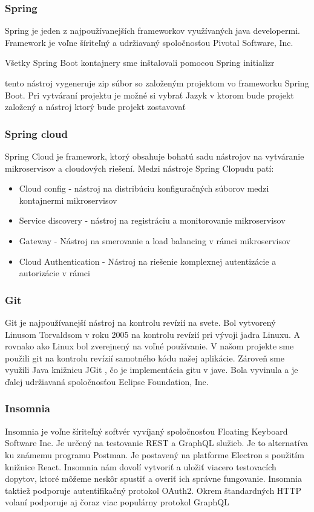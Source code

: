 \subsubsection{Spring}
Spring je jeden z najpoužívanejších frameworkov využívaných java developermi. Framework je voľne šíriteľný a udržiavaný spoločnosťou Pivotal Software, Inc.

Všetky Spring Boot kontajnery sme inštalovali pomocou Spring initializr \cite{initializr}

tento nástroj vygeneruje zip súbor so založeným projektom vo frameworku Spring Boot. Pri vytváraní projektu je možné si vybrať Jazyk v ktorom bude projekt založený a nástroj ktorý bude projekt zostavovať %

\subsubsection{Spring cloud}

Spring Cloud je framework, ktorý obsahuje bohatú sadu nástrojov na vytváranie mikroservisov a cloudových riešení. Medzi nástroje Spring Clopudu patí:

\begin{itemize}
	\item Cloud config - nástroj na distribúciu konfiguračných súborov medzi kontajnermi mikroservisov
	\item Service discovery - nástroj na registráciu a monitorovanie mikroservisov
    \item Gateway - Nástroj na smerovanie a load balancing v rámci mikroservisov
	\item Cloud Authentication - Nástroj na riešenie komplexnej autentizácie a autorizácie v rámci

\end{itemize}

\subsubsection{Git}
Git je najpoužívanejší nástroj na kontrolu revízií na svete. Bol vytvorený Linusom Torvaldsom v roku 2005 na kontrolu revízií pri vývoji jadra Linuxu. A rovnako ako Linux bol zverejnený na voľné používanie. V našom projekte sme použili git na kontrolu revízií samotného kódu našej aplikácie. Zároveň sme využili Java knižnicu JGit \cite{jgit}, čo je implementácia gitu v jave. Bola vyvinula a je ďalej udržiavaná spoločnosťou Eclipse Foundation, Inc.

\subsubsection{Insomnia}
Insomnia \cite{insomnia} je voľne šíriteľný softvér vyvíjaný spoločnosťou Floating Keyboard Software Inc. Je určený na testovanie REST a GraphQL služieb. Je to alternatíva ku známemu programu Postman. Je postavený na platforme Electron s použitím knižnice React. Insomnia nám dovolí vytvoriť a uložiť viacero testovacích dopytov, ktoré môžeme neskôr spustiť a overiť ich správne fungovanie. Insomnia taktiež podporuje autentifikačný protokol OAuth2. Okrem štandardných HTTP volaní podporuje aj čoraz viac populárny protokol GraphQL

